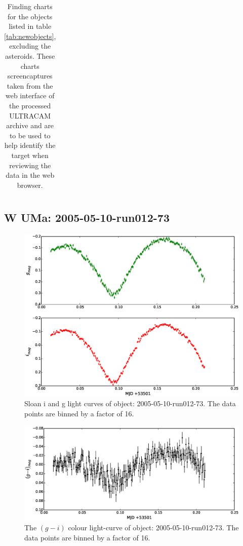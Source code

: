 \begin{table}
\begin{tabular}{ccc}
   \\
  \end{tabular}
  \caption{Finding charts for the objects listed in table \ref{tab:newobjects}, excluding the asteroids. These charts screencaptures taken from the web interface of the processed ULTRACAM archive and are to be used to help identify the target when reviewing the data in the web browser.}
  \label{tab:findingcharts}
\end{table}

\newpage

\subsection{{W UMa}: 2005-05-10-run012-73}

  \begin{figure}
    \center
    \includegraphics[width=120mm]{images/2005-05-10-run012-lightcurve-bin16.eps} 
    \caption{Sloan i and g light curves of object: 2005-05-10-run012-73. The data points are binned by a factor of 16. }
    \label{fig:2005-05-10-run012}
  \end{figure}
  
  \begin{figure}
    \center
    \includegraphics[width=120mm]{images/2005-05-10-run012-colourcurve-bin16.eps} 
    \caption{The $(g - i)$ colour light-curve of object: 2005-05-10-run012-73. The data points are binned by a factor of 16. }
    \label{fig:2005-05-10-run012-colour} 
  \end{figure}
  

